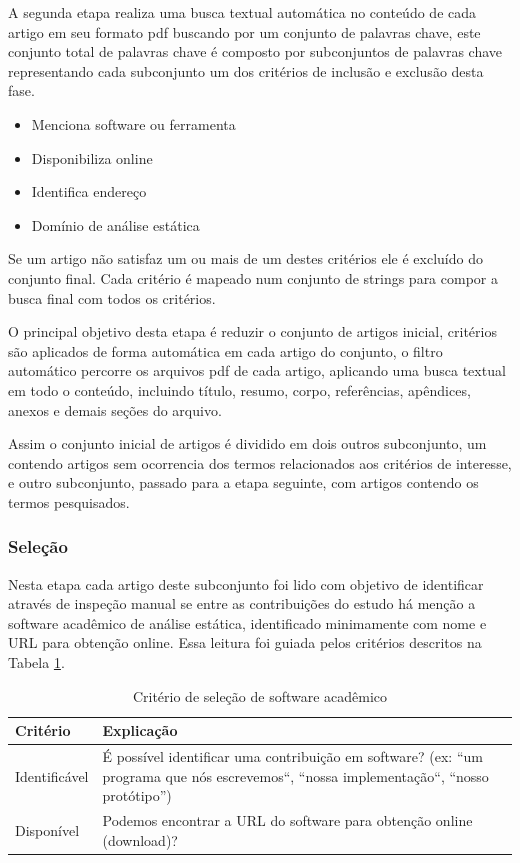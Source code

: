 A segunda etapa realiza uma busca textual automática no conteúdo de cada artigo
em seu formato pdf buscando por um conjunto de palavras chave, este conjunto
total de palavras chave é composto por subconjuntos de palavras chave
representando cada subconjunto um dos critérios de inclusão e exclusão desta
fase.

\begin{itemize}
  \item Menciona software ou ferramenta
  \item Disponibiliza online
  \item Identifica endereço
  \item Domínio de análise estática
\end{itemize}

Se um artigo não satisfaz um ou mais de um destes critérios ele é excluído do
conjunto final. Cada critério é mapeado num conjunto de strings para compor a
busca final com todos os critérios.

O principal objetivo desta etapa é reduzir o conjunto de artigos inicial,
critérios são aplicados de forma automática em cada artigo do conjunto, o
filtro automático percorre os arquivos pdf de cada artigo, aplicando uma busca
textual em todo o conteúdo, incluindo título, resumo, corpo, referências,
apêndices, anexos e demais seções do arquivo.

Assim o conjunto inicial de artigos é dividido em dois outros subconjunto, um
contendo artigos sem ocorrencia dos termos relacionados aos critérios de
interesse, e outro subconjunto, passado para a etapa seguinte, com artigos
contendo os termos pesquisados.

\subsubsection{Seleção}

Nesta etapa cada artigo deste subconjunto foi lido com objetivo de identificar
através de inspeção manual se entre as contribuições do estudo há menção a
software acadêmico de análise estática, identificado minimamente com nome e URL
para obtenção online. 
Essa leitura foi guiada pelos critérios descritos na Tabela \ref{criterios-selecao}.

\begin{table}[h]
\caption{Critério de seleção de software acadêmico}
\centering
\begin{tabular}{ l p{12cm} }
  \hline
  Critério         & Explicação \\
  \hline
  Identificável    & É possível identificar uma contribuição em software? (ex: ``um programa que nós escrevemos``, ``nossa implementação``, ``nosso protótipo'') \\
  Disponível       & Podemos encontrar a URL do software para obtenção online (download)? \\
  \hline
\end{tabular}
\label{criterios-selecao}
\end{table}

